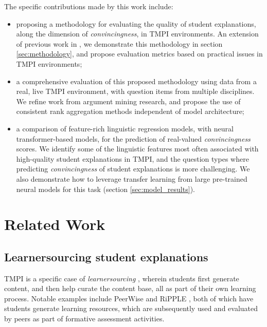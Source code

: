\documentclass[notitlepage,12pt]{jedm}
\begin{document}
The specific contributions made by this work include:
\begin{itemize}
	\item proposing a methodology for evaluating the quality of student 
	explanations, along the dimension of \textit{convincingness}, in TMPI 
	environments. 
	An extension of previous work in , we 
	demonstrate this methodology in section \ref{sec:methodology}, and 
	propose evaluation metrics based on practical issues in TMPI environments;
	
	\item a comprehensive evaluation of this proposed methodology using data 
	from a real, live TMPI environment, with question items from multiple 
	disciplines. 
	We refine work from argument mining research, and propose the use of 
	consistent rank aggregation methods independent of model architecture;
	
	\item a comparison of feature-rich linguistic regression models, with 
	neural transformer-based models, for the prediction of real-valued
	\textit{convincingness} scores. 
	We identify some of the linguistic features most often associated with 
	high-quality student explanations in TMPI, and the question types where 
	predicting \textit{convincingness} of student explanations is more 
	challenging.
	We also demonstrate how to leverage transfer learning from large 
	pre-trained neural models for this task (section \ref{sec:model_results}).
\end{itemize}


\section{Related Work}\label{sec:related_work}

\subsection{Learnersourcing student explanations}
TMPI is a specific case of  \textit{learnersourcing} 
\cite{weir_learnersourcing_2015}, wherein students first generate content, and 
then help curate the content base, all as part of their own learning process.
Notable examples include PeerWise \cite{denny_peerwise:_2008} and RiPPLE 
\cite{khosravi_ripple_2019}, both of which have students generate learning 
resources, which are subsequently used and evaluated by peers as part of 
formative assessment activities.
\end{document}

